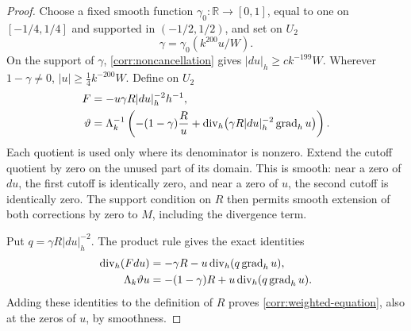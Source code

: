 \begin{proof}
Choose a fixed smooth function \(\gamma_0:\mathbb R\to[0,1]\), equal
to one on \([-1/4,1/4]\) and supported in \((-1/2,1/2)\), and set on
\(U_2\)
\[
 \gamma=\gamma_0(k^{200}u/W).
\]
On the support of \(\gamma\),
\eqref{corr:noncancellation} gives
\(|du|_h\ge c k^{-199}W\).  Wherever \(1-\gamma\ne0\),
\(|u|\ge\tfrac14 k^{-200}W\).  Define on \(U_2\)
\begin{align}
 F&=-u\gamma R|du|_h^{-2}h^{-1},\label{corr:F}\\
 \vartheta&=\Lambda_k^{-1}\left(
       -(1-\gamma)\frac R u
       +\operatorname{div}_h\bigl(\gamma R|du|_h^{-2}\operatorname{grad}_hu\bigr)
                       \right).\label{corr:theta}
\end{align}
Each quotient is used only where its denominator is nonzero.  Extend
the cutoff quotient by zero on the unused part of its domain.  This is
smooth: near a zero of \(du\), the first cutoff is identically zero,
and near a zero of \(u\), the second cutoff is identically zero.
The support condition on \(R\) then permits smooth extension of both
corrections by zero to \(M\), including the divergence term.

Put \(q=\gamma R|du|_h^{-2}\).  The product rule gives the exact
identities
\begin{align*}
 \operatorname{div}_h(Fdu)&=-\gamma R-u\operatorname{div}_h(q\operatorname{grad}_hu),\\
 \Lambda_k\vartheta u&=-(1-\gamma)R
                         +u\operatorname{div}_h(q\operatorname{grad}_hu).
\end{align*}
Adding these identities to the definition of \(R\) proves
\eqref{corr:weighted-equation}, also at the zeros of \(u\), by
smoothness.


\end{proof}
